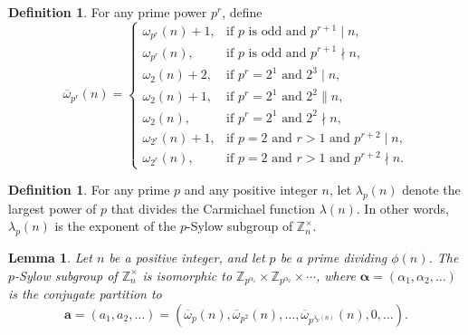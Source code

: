 \documentclass[12pt,reqno]{amsart}
\newtheorem{lemma}[theorem]{Lemma}
\theoremstyle{definition}
\newtheorem{definition}[theorem]{Definition}
\newcommand{\ovomega}{{\overline\omega}}
\newcommand{\Z}{{\mathbb Z}}
\newcommand{\Znt}{{\Z_n^\times}}
\newcommand{\ba}{{\bm a}}
\newcommand{\balpha}{{\bm\alpha}}
\begin{document}
\begin{definition}
For any prime power $p^r$, define
\[
\ovomega_{p^r}(n) = \begin{cases}
\omega_{p^r}(n)+1, &\text{if $p$ is odd and } p^{r+1}\mid n, \\
\omega_{p^r}(n), &\text {if $p$ is odd and } p^{r+1}\nmid n, \\
\omega_{2}(n)+2, &\text{if $p^r=2^1$ and } 2^3\mid n, \\
\omega_{2}(n)+1, &\text{if $p^r=2^1$ and } 2^2\parallel n, \\
\omega_{2}(n), &\text{if $p^r=2^1$ and } 2^2\nmid n, \\
\omega_{2^r}(n)+1, &\text{if $p=2$ and $r>1$ and } p^{r+2}\mid n, \\
\omega_{2^r}(n), &\text{if $p=2$ and $r>1$ and } p^{r+2}\nmid n.
\end{cases}
\]
\end{definition}

\begin{definition}  \label{lambda p def}
For any prime $p$ and any positive integer $n$, let $\lambda_p(n)$ denote the largest power of $p$ that divides the Carmichael function $\lambda(n)$. In other words, $\lambda_p(n)$ is the exponent of the $p$-Sylow subgroup of $\Znt$.
\end{definition}

\begin{lemma}  \label{p Sylow structure lemma}
Let $n$ be a positive integer, and let $p$ be a prime dividing $\phi(n)$. The $p$-Sylow subgroup of $\Znt$ is isomorphic to
$\Z_{p^{\alpha_1}} \times \Z_{p^{\alpha_2}} \times \cdots$,
where $\balpha = (\alpha_1,\alpha_2,\dots)$ is the conjugate partition to
\[
\ba = (a_1,a_2,\dots) = (\ovomega_p(n), \ovomega_{p^2}(n), \dots, \ovomega_{p^{\lambda_p(n)}}(n), 0, \dots).
\]
\end{lemma}
\end{document}
